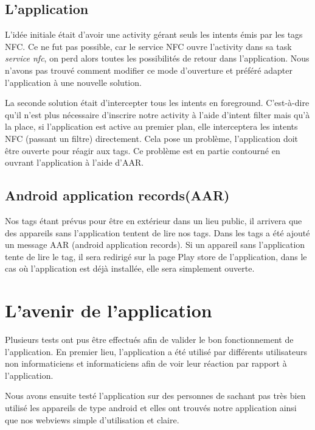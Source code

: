 \documentclass[a4paper,11pt]{article}
\begin{document}
      \subsection{L’application}
      L’idée initiale était d’avoir une activity gérant seuls les intents émis par les tags NFC. 
      Ce ne fut pas possible, car le service NFC ouvre l’activity dans sa task \textit{service nfc}, on perd alors toutes les possibilités de retour 
      dans l’application. 
      Nous n’avons pas trouvé comment modifier ce mode d’ouverture et préféré adapter l’application à une nouvelle solution.
      
      La seconde solution était d’intercepter tous les intents en foreground. 
      C'est-à-dire qu’il n’est plus nécessaire d’inscrire notre activity à l’aide d’intent filter mais qu’à la place, 
      si l’application est active au premier plan, elle interceptera les intents NFC (passant un filtre) directement. 
      Cela pose un problème, l’application doit être ouverte pour réagir aux tags. 
      Ce problème est en partie contourné en ouvrant l’application à l’aide d’AAR.
      
      \subsection{Android application records(AAR)}
      Nos tags étant prévus pour être en extérieur dans un lieu public, il arrivera que des appareils sans l’application tentent de lire nos tags. 
      Dans les tags a été ajouté un message AAR (android application records). 
      Si un appareil sans l’application tente de lire le tag, il sera redirigé sur la page Play store de l’application, 
      dans le cas où l’application est déjà installée, elle sera simplement ouverte.
    
		\section{L'avenir de l'application}
		
		Plusieurs tests ont pus être effectués afin de valider le bon fonctionnement de l'application. En premier lieu, l'application a été utilisé par différents utilisateurs non informaticiens et informaticiens afin de voir leur réaction par rapport à l'application.

		Nous avons ensuite testé l'application sur des personnes de sachant pas très bien utilisé les appareils de type android et elles ont trouvés notre application ainsi que nos webviews simple d'utilisation et claire.
\end{document}
